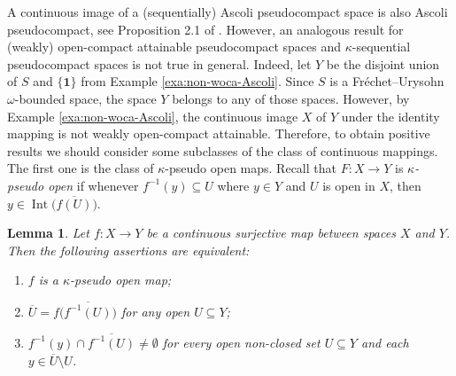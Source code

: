 \documentclass[preprint,11pt]{elsarticle}
\def\Int{\operatorname{Int}}
\newtheorem{lemma}[theorem]{Lemma}
\numberwithin{equation}{section}
\numberwithin{theorem}{section}
\newcommand{\w}{\omega}
\newcommand{\SM}{{\setminus}}
\begin{document}






A continuous image of a (sequentially) Ascoli pseudocompact space is also Ascoli pseudocompact, see Proposition 2.1 of \cite{Gabr-pseudo-Ascoli}. However, an analogous result for (weakly) open-compact attainable pseudocompact  spaces and $\kappa$-sequential pseudocompact  spaces is not true in general. Indeed, let $Y$ be the disjoint union of $S$ and $\{\mathbf{1}\}$ from Example \ref{exa:non-woca-Ascoli}. Since $S$ is a Fr\'{e}chet--Urysohn $\w$-bounded space, the space $Y$ belongs to any of those spaces. However, by Example \ref{exa:non-woca-Ascoli}, the continuous image $X$ of $Y$ under the identity mapping is not weakly open-compact attainable. Therefore, to obtain positive results we should consider some subclasses of the class of continuous mappings. The first one is the class of  $\kappa$-pseudo open maps. Recall that $F:X\to Y$ is {\em  $\kappa$-pseudo open } if whenever $f^{-1}(y)\subseteq U$ where $y\in Y$ and $U$ is open in $X$, then $y\in \Int\big(\overline{f(U)}\big)$.

\begin{lemma} \label{l:charac-dagger-map}
Let $f:X\to Y$ be a continuous surjective map between spaces $X$ and $Y$. Then the following assertions are equivalent:
\begin{enumerate}
\item[{\rm(i)}] $f$ is a  $\kappa$-pseudo open map;
\item[{\rm(ii)}] $\overline{U}=f\big(\overline{f^{-1}(U)}\big)$ for any open $U\subseteq Y$;
\item[{\rm(iii)}] $f^{-1}(y)\cap \overline{f^{-1}(U)}\not=\emptyset$ for every open non-closed set $U\subseteq Y$ and each $y\in \overline{U}\SM U$.
\end{enumerate}
\end{lemma}
\end{document}
